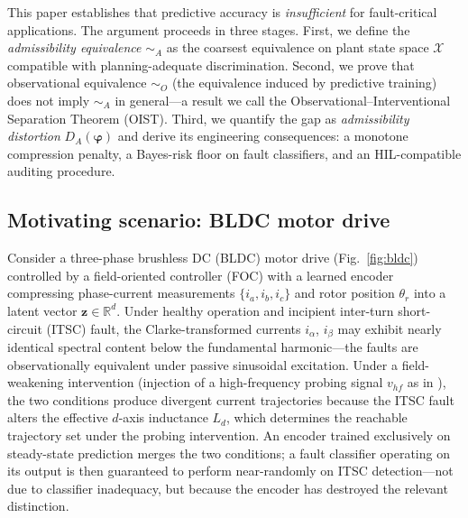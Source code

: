 \documentclass[10pt,twocolumn]{article}
\theoremstyle{plain}
\theoremstyle{definition}
\theoremstyle{remark}
\newcommand{\simA}{\sim_{\!A}}
\newcommand{\DA}{D_{A}(\bm{\varphi})}
\newcommand{\calX}{\mathcal{X}}
\newcommand{\R}{\mathbb{R}}
\begin{document}
This paper establishes that predictive accuracy is \emph{insufficient} for
fault-critical applications. The argument proceeds in three stages. First,
we define the \emph{admissibility equivalence} $\simA$ as the coarsest
equivalence on plant state space $\calX$ compatible with planning-adequate
discrimination. Second, we prove that observational equivalence $\sim_{\!O}$
(the equivalence induced by predictive training) does not imply $\simA$
in general---a result we call the Observational--Interventional Separation
Theorem (OIST). Third, we quantify the gap as \emph{admissibility distortion}
$\DA$ and derive its engineering consequences: a monotone compression penalty,
a Bayes-risk floor on fault classifiers, and an HIL-compatible auditing procedure.

\subsection{Motivating scenario: BLDC motor drive}

Consider a three-phase brushless DC (BLDC) motor drive (Fig.~\ref{fig:bldc})
controlled by a field-oriented controller (FOC) with a learned encoder
compressing phase-current measurements $\{i_a, i_b, i_c\}$ and rotor position
$\theta_r$ into a latent vector $\bm{z} \in \R^d$. Under healthy operation
and incipient inter-turn short-circuit (ITSC) fault, the Clarke-transformed
currents $i_\alpha$, $i_\beta$ may exhibit nearly identical spectral content
below the fundamental harmonic---the faults are observationally equivalent
under passive sinusoidal excitation. Under a field-weakening intervention
(injection of a high-frequency probing signal $v_{hf}$ as in
\cite{holtz2006sensorless}), the two conditions produce divergent current
trajectories because the ITSC fault alters the effective $d$-axis inductance
$L_d$, which determines the reachable trajectory set under the probing
intervention. An encoder trained exclusively on steady-state prediction merges
the two conditions; a fault classifier operating on its output is then
guaranteed to perform near-randomly on ITSC detection---not due to classifier
inadequacy, but because the encoder has destroyed the relevant distinction.
\end{document}
